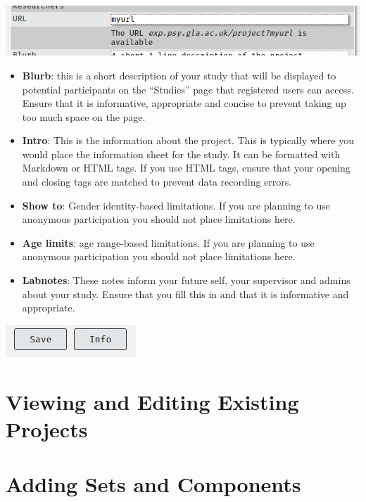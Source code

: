\documentclass[]{book}
\providecommand{\tightlist}{%
  \setlength{\itemsep}{0pt}\setlength{\parskip}{0pt}}
\begin{document}
\includegraphics{images/screenshots/proj_4.png}

\begin{itemize}
\tightlist
\item
  \textbf{Blurb}: this is a short description of your study that will be
  displayed to potential participants on the ``Studies'' page that
  registered users can access. Ensure that it is informative,
  appropriate and concise to prevent taking up too much space on the
  page.
\item
  \textbf{Intro}: This is the information about the project. This is
  typically where you would place the information sheet for the study.
  It can be formatted with Markdown or HTML tags. If you use HTML tags,
  ensure that your opening and closing tags are matched to prevent data
  recording errors.
\item
  \textbf{Show to}: Gender identity-based limitations. If you are
  planning to use anonymous participation you should not place
  limitations here.
\item
  \textbf{Age limits}: age range-based limitations. If you are planning
  to use anonymous participation you should not place limitations here.
\item
  \textbf{Labnotes}: These notes inform your future self, your
  supervisor and admins about your study. Ensure that you fill this in
  and that it is informative and appropriate.
\end{itemize}

\includegraphics{images/screenshots/proj_5.png}

\section{Viewing and Editing Existing
Projects}\label{viewing-and-editing-existing-projects}

\section{Adding Sets and Components}\label{adding-sets-and-components}
\end{document}

